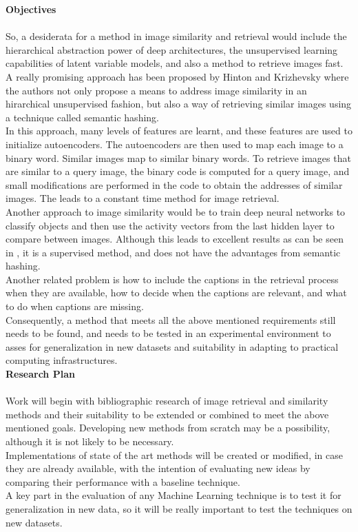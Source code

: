 \documentclass[letter,12pt,english]{article}
\begin{document}
{\bf Objectives}\\\\
So, a desiderata for a method in image similarity and retrieval would include the hierarchical abstraction power
of deep architectures, the unsupervised learning capabilities of latent variable models, and also a method to
retrieve images fast. A really promising approach has been proposed by Hinton and Krizhevsky\cite{hinton1} 
where the authors not only propose a means to address image similarity in an hirarchical unsupervised fashion,
but also a way of retrieving similar images using a technique called semantic hashing\cite{hinton3}.\\
In this approach, many levels of features are learnt, and these features are used to initialize autoencoders.
The autoencoders are then used to map each image to a binary word. Similar images map to similar binary words.
To retrieve images that are similar to a query image, the binary code is computed for a query image, and
small modifications are performed in the code to obtain the addresses of similar images. The leads to a constant
time method for image retrieval.\\
Another approach to image similarity would be to train deep neural networks to classify objects and then use
the activity vectors from the last hidden layer to compare between images. Although this leads to excellent
results as can be seen in \cite{hinton2}, it is a supervised method, and does not have the advantages from
semantic hashing.\\
Another related problem is how to include the captions in the retrieval process when they are available, 
how to decide when the captions are relevant, and what to do when captions are missing.\\
Consequently, a method that meets all the above mentioned requirements still needs to be found, and needs to be tested
in an experimental environment to asses for generalization in new datasets and suitability in adapting
to practical computing infrastructures. \\

{\bf Research Plan}\\\\
Work will begin with bibliographic research of image retrieval and similarity methods and their suitability
to be extended or combined to meet the above mentioned goals. Developing new methods from scratch may be a
possibility, although it is not likely to be necessary.\\
Implementations of state of the art methods will be created or modified, in case they are already available,
with the intention of evaluating new ideas by comparing their performance with a baseline
technique.\\
A key part in the evaluation of any Machine Learning technique is to test it for generalization in new
data, so it will be really important to test the techniques on new datasets.
\end{document}
